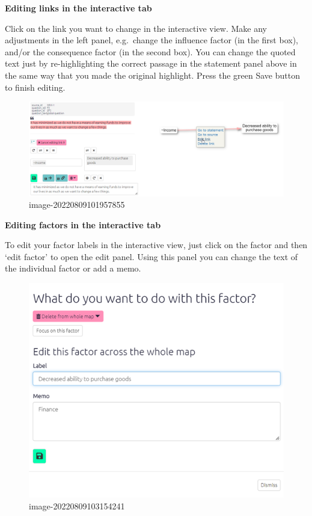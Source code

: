 \documentclass[
]{book}
\begin{document}
\textbf{Editing links in the interactive tab}

Click on the link you want to change in the interactive view. Make any adjustments in the left panel, e.g.~change the influence factor (in the first box), and/or the consequence factor (in the second box). You can change the quoted text just by re-highlighting the correct passage in the statement panel above in the same way that you made the original highlight. Press the green Save button to finish editing.

\begin{figure}
\centering
\includegraphics[width=6.77083in,height=\textheight]{_assets/image-20220809101957855.png}
\caption{image-20220809101957855}
\end{figure}

\textbf{Editing factors in the interactive tab}

To edit your factor labels in the interactive view, just click on the factor and then `edit factor' to open the edit panel. Using this panel you can change the text of the individual factor or add a memo.

\begin{figure}
\centering
\includegraphics[width=6.77083in,height=\textheight]{_assets/image-20220809103154241.png}
\caption{image-20220809103154241}
\end{figure}
\end{document}
